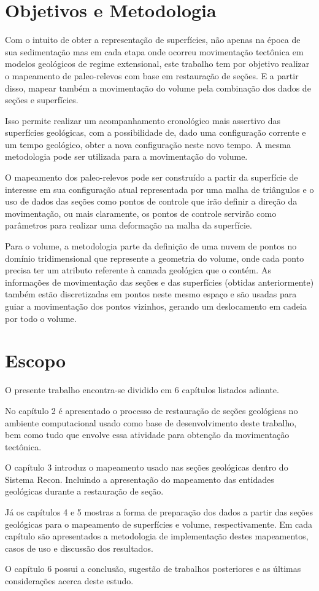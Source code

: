 \fi

\section{Objetivos e Metodologia}

Com o intuito de obter a representação de superfícies, não apenas na época de sua sedimentação mas em cada etapa onde ocorreu movimentação tectônica em modelos geológicos de regime extensional, este trabalho tem por objetivo realizar o mapeamento de paleo-relevos com base em restauração de seções. E a partir disso, mapear também a movimentação do volume pela combinação dos dados de seções e superfícies.

Isso permite realizar um acompanhamento cronológico mais assertivo das superfícies geológicas, com a possibilidade de, dado uma configuração corrente e um tempo geológico, obter a nova configuração neste novo tempo. A mesma metodologia pode ser utilizada para a movimentação do volume.

O mapeamento dos paleo-relevos pode ser construído a partir da superfície de interesse em sua configuração atual representada por uma malha de triângulos e o uso de dados das seções como pontos de controle que irão definir a direção da movimentação, ou mais claramente, os pontos de controle servirão como parâmetros para realizar uma deformação na malha da superfície.

Para o volume, a metodologia parte da definição de uma nuvem de pontos no domínio tridimensional que represente a geometria do volume, onde cada ponto precisa ter um atributo referente à camada geológica que o contém. As informações de movimentação das seções e das superfícies (obtidas anteriormente) também estão discretizadas em pontos neste mesmo espaço e são usadas para guiar a movimentação dos pontos vizinhos, gerando um deslocamento em cadeia por todo o volume. 

\section{Escopo}

O presente trabalho encontra-se dividido em 6 capítulos listados adiante.

No capítulo 2 é apresentado o processo de restauração de seções geológicas no ambiente computacional usado como base de desenvolvimento deste trabalho, bem como tudo que envolve essa atividade para obtenção da movimentação tectônica.

O capítulo 3 introduz o mapeamento usado nas seções geológicas dentro do Sistema Recon. Incluindo a apresentação do mapeamento das entidades geológicas durante a restauração de seção.

Já os capítulos 4 e 5 mostras a forma de preparação dos dados a partir das seções geológicas para o mapeamento de superfícies e volume, respectivamente. Em cada capítulo são apresentados a metodologia de implementação destes mapeamentos, casos de uso e discussão dos resultados.

O capítulo 6 possui a conclusão, sugestão de trabalhos posteriores e as últimas considerações acerca deste estudo.




